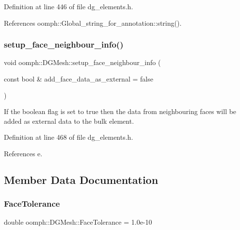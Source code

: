 Definition at line 446 of file dg\+\_\+elements.\+h.



References oomph\+::\+Global\+\_\+string\+\_\+for\+\_\+annotation\+::string().

\mbox{\label{classoomph_1_1DGMesh_ac8839d6d15a037536217b84e32dd2ae3}} 
\subsubsection{\texorpdfstring{setup\+\_\+face\+\_\+neighbour\+\_\+info()}{setup\_face\_neighbour\_info()}}
{\footnotesize\ttfamily void oomph\+::\+D\+G\+Mesh\+::setup\+\_\+face\+\_\+neighbour\+\_\+info (\begin{DoxyParamCaption}\item[{const bool \&}]{add\+\_\+face\+\_\+data\+\_\+as\+\_\+external = {\ttfamily false} }\end{DoxyParamCaption})\hspace{0.3cm}{\ttfamily [inline]}}

If the boolean flag is set to true then the data from neighbouring faces will be added as external data to the bulk element. 

Definition at line 468 of file dg\+\_\+elements.\+h.



References e.



\subsection{Member Data Documentation}
\mbox{\label{classoomph_1_1DGMesh_ad130d7e5d2778f37cc032633b73391e5}} 
\subsubsection{\texorpdfstring{Face\+Tolerance}{FaceTolerance}}
{\footnotesize\ttfamily double oomph\+::\+D\+G\+Mesh\+::\+Face\+Tolerance = 1.\+0e-\/10\hspace{0.3cm}{\ttfamily [static]}}



